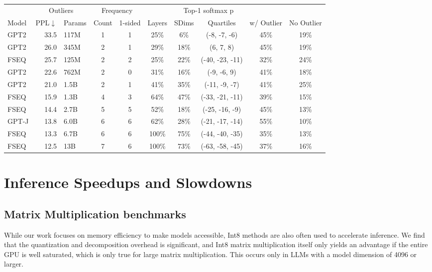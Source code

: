 \documentclass{article}
\begin{document}
\begin{table}[]
{\begin{tabular}{lrlccccccc}
   &
  \multicolumn{2}{c}{Outliers} &
  \multicolumn{2}{c}{Frequency} &
   &
  \multicolumn{2}{c}{Top-1 softmax p} \\ \cmidrule{4-7} \cmidrule{9-10}  
Model &
  \multicolumn{1}{l}{PPL\bf{$\downarrow$}} &
  Params &
  Count &
  1-sided &
  Layers &
  SDims &
  Quartiles &
  w/ Outlier &
  No Outlier \\\toprule
GPT2  & 33.5 & 117M   & 1 & 1 & 25\%  & 6\%  & (-8, -7, -6)            & 45\% & 19\% \\
GPT2  & 26.0   & 345M   & 2 & 1 & 29\%  & 18\% & (6, 7, 8)                & 45\% & 19\% \\
FSEQ  & 25.7 & 125M  & 2 & 2 & 25\%  & 22\% & (-40, -23, -11)            & 32\%  & 24\% \\
GPT2  & 22.6 & 762M   & 2 & 0 & 31\%  & 16\% & (-9, -6, 9)               & 41\% & 18\% \\
GPT2  & 21.0   & 1.5B   & 2 & 1 & 41\%  & 35\% & (-11, -9, -7)    & 41\% & 25\% \\
FSEQ  & 15.9 & 1.3B  & 4 & 3 & 64\%  & 47\% & (-33, -21, -11) & 39\% & 15\% \\
FSEQ  & 14.4 & 2.7B  & 5 & 5 & 52\%  & 18\% & (-25, -16, -9)            & 45\% & 13\% \\
GPT-J & 13.8 & 6.0B   & 6 & 6 & 62\%  & 28\% & (-21, -17, -14)           & 55\% & 10\% \\\midrule
FSEQ  & 13.3 & 6.7B  & 6 & 6 & 100\% & 75\% & (-44, -40, -35)           & 35\% & 13\% \\
FSEQ  & 12.5 & 13B   & 7 & 6 & 100\% & 73\% & (-63, -58, -45)   & 37\% & 16\%\\\bottomrule
\end{tabular}%
}
\end{table}

\section{Inference Speedups and Slowdowns}
\label{app:inference}

\subsection{Matrix Multiplication benchmarks}

While our work focuses on memory efficiency to make models accessible, Int8 methods are also often used to accelerate inference. We find that the quantization and decomposition overhead is significant, and Int8 matrix multiplication itself only yields an advantage if the entire GPU is well saturated, which is only true for large matrix multiplication. This occurs only in LLMs with a model dimension of 4096 or larger.
\end{document}
